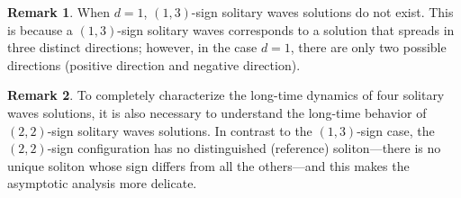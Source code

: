 \documentclass[reqno]{amsart}
\theoremstyle{plain}
\theoremstyle{definition}
\newtheorem{remark}{Remark}[section]
\numberwithin{equation}{section}
\newcommand{\1}{\mathbbm{1}}
\begin{document}
\begin{remark}
When $d=1$, $(1,3)$-sign solitary waves solutions do not exist. This is because a $(1,3)$-sign solitary waves corresponds to a solution that spreads in three distinct directions; however, in the case $d=1$, there are only two possible directions (positive direction and negative direction). 
\end{remark}


\begin{remark}
To completely characterize the long-time dynamics of four solitary waves solutions, it is also necessary to understand the long-time behavior of $(2,2)$-sign solitary waves solutions.
In contrast to the $(1,3)$-sign case, the $(2,2)$-sign configuration has no distinguished (reference) soliton---there is no unique soliton whose sign differs from all the others---and this makes the asymptotic analysis more delicate.
\end{remark}
\end{document}
